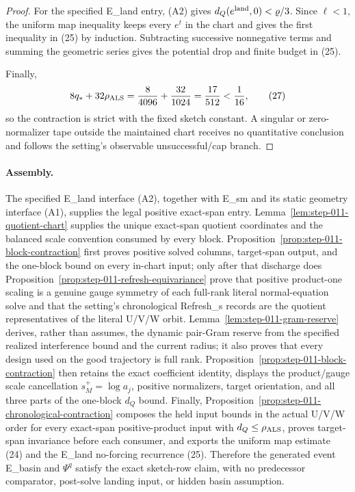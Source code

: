 \begin{proposition}
\begin{proof}
For the specified E\_land entry, (A2) gives
\(d_Q(e^{\rm land},0)<\varrho/3\). Since \(\ell<1\), the uniform map
inequality keeps every \(e^t\) in the chart and gives the first inequality
in (25) by induction. Subtracting successive nonnegative terms and summing
the geometric series gives the potential drop and finite budget in (25).

Finally,
\[
 8q_*+32\rho_{\rm ALS}
 ={8\over4096}+{32\over1024}
 ={17\over512}< {1\over16},
\tag{27}
\]
so the contraction is strict with the fixed sketch constant. A singular or
zero-normalizer tape outside the maintained chart receives no quantitative
conclusion and follows the setting's observable unsuccessful/cap branch.

\end{proof}
\end{proposition}
\paragraph{Assembly.}

The specified E\_land interface (A2), together with E\_sm and its static
geometry interface (A1), supplies the legal positive exact-span entry.
Lemma~\ref{lem:step-011-quotient-chart} supplies the unique exact-span
quotient coordinates and the balanced scale convention consumed by every
block. Proposition~\ref{prop:step-011-block-contraction} first proves
positive solved columns, target-span output, and the one-block bound on every
in-chart input; only after that discharge does
Proposition~\ref{prop:step-011-refresh-equivariance} prove that
positive product-one scaling is a genuine gauge symmetry of each full-rank
literal normal-equation solve and that the setting's chronological
Refresh\_s records are the quotient representatives of the literal U/V/W
orbit. Lemma~\ref{lem:step-011-gram-reserve} derives, rather than assumes,
the dynamic pair-Gram reserve from the specified realized interference bound
and the current radius; it also proves that every design used on the good
trajectory is full rank. Proposition~\ref{prop:step-011-block-contraction}
then retains the exact coefficient identity, displays the product/gauge
scale cancellation
\(s_M^+=\log a_j\), positive normalizers, target orientation, and all three
parts of the one-block \(d_Q\) bound. Finally,
Proposition~\ref{prop:step-011-chronological-contraction} composes the held
input bounds in the actual U/V/W order for every exact-span positive-product
input with \(d_Q\le\rho_{\rm ALS}\), proves target-span invariance before
each consumer, and exports the uniform map estimate (24) and the E\_land
no-forcing recurrence (25). Therefore the generated event E\_basin and
\(\Psi^q\) satisfy the exact sketch-row claim, with no predecessor
comparator, post-solve landing input, or hidden basin assumption.


